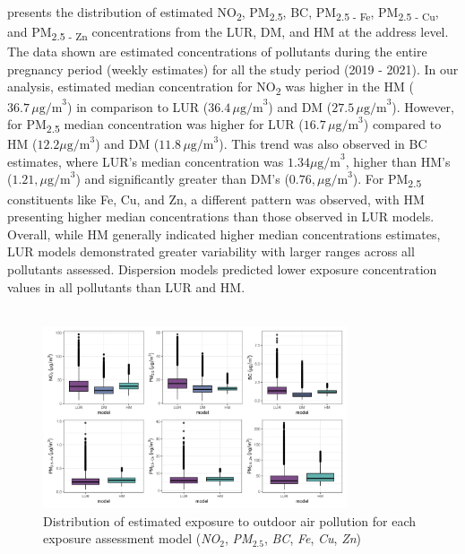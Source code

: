 \documentclass{article}
\begin{document}
\textbf{} presents the distribution of estimated NO\textsubscript{2}, PM\textsubscript{2.5}, BC,  PM\textsubscript{2.5 - Fe}, PM\textsubscript{2.5 - Cu}, and PM\textsubscript{2.5 - Zn} concentrations from the LUR, DM, and HM at the address level. The data shown are estimated concentrations of pollutants during the entire pregnancy period (weekly estimates) for all the study period (2019 - 2021). In our analysis, estimated median concentration for NO\textsubscript{2} was higher in the HM ($36.7 \, \mu\text{g/m}^{3}$) in comparison to LUR ($36.4 \, \mu\text{g/m}^{3}$) and DM ($27.5 \, \mu\text{g/m}^{3}$). However, for PM\textsubscript{2.5} median concentration was higher for LUR ($16.7 \, \mu\text{g/m}^{3}$) compared to HM ($12.2 \mu\text{g/m}^{3}$) and DM ($11.8 \, \mu\text{g/m}^{3}$). This trend was also observed in BC estimates, where LUR's median concentration was $1.34  \mu\text{g/m}^{3}$, higher than HM's ($1.21 , \mu\text{g/m}^{3}$) and significantly greater than DM's ($0.76 , \mu\text{g/m}^{3}$). For PM\textsubscript{2.5} constituents like Fe, Cu, and Zn, a different pattern was observed, with HM presenting higher median concentrations than those observed in LUR models. Overall, while HM generally indicated higher median concentrations estimates, LUR models demonstrated greater variability with larger ranges across all pollutants assessed. Dispersion models predicted lower exposure concentration values in all pollutants than LUR and HM. \\\\

\begin{figure}[!h]
\includegraphics[width=0.8\textwidth]{figures/boxplot_all_models_estimates.png}
\caption{Distribution of estimated exposure to outdoor air pollution for each exposure assessment model (\textit{NO$_2$}, \textit{PM$_{2.5}$}, \textit{BC}, \textit{Fe}, \textit{Cu}, \textit{Zn})}
\label{fig4}
\end{figure}
\end{document}
